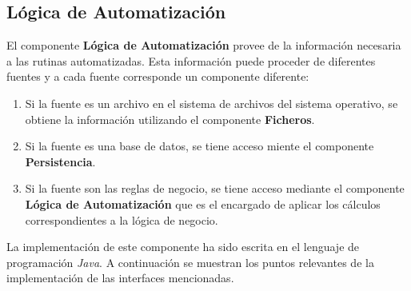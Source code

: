 \subsection{Lógica de Automatización}
El componente \textbf{Lógica de Automatización} provee de la información necesaria a las rutinas automatizadas. Esta información puede proceder de diferentes fuentes y a cada fuente corresponde un componente diferente:
\begin{enumerate}
 	\item Si la fuente es un archivo en el sistema de archivos del sistema operativo, se obtiene la información utilizando el componente \textbf{Ficheros}.
 	\item Si la fuente es una base de datos, se tiene acceso miente el componente \textbf{Persistencia}.
 	\item Si la fuente son las reglas de negocio, se tiene acceso mediante el componente \textbf{Lógica de Automatización} que es el encargado de aplicar los cálculos correspondientes a la lógica de negocio.
\end{enumerate}
La implementación de este componente ha sido escrita en el lenguaje de programación \textit{Java}. A continuación se muestran los puntos relevantes de la implementación de las interfaces mencionadas.
